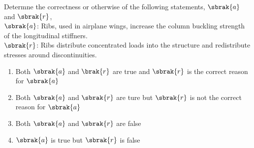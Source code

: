 	\item Determne the correctness or otherwise of the following statements, $\sbrak{a}$ and $\sbrak{r}$, \\
		$\sbrak{a}$: Ribs, used in airplane wings, increase the column buckling strength of the longitudinal stiffners. \\
		$\sbrak{r}$: Ribs distribute concentrated loads into the structure and redistribute stresses around discontinuities.
		\begin{enumerate}
			\item Both $\sbrak{a}$ and $\brak{r}$ are true and $\sbrak{r}$ is the correct reason for $\sbrak{a}$
			\item Both $\sbrak{a}$ and $\sbrak{r}$ are ture but $\sbrak{r}$ is not the correct reason for $\sbrak{a}$
			\item Both $\sbrak{a}$ and $\sbrak{r}$ are false
			\item $\sbrak{a}$ is true but $\sbrak{r}$ is false
		\end{enumerate}


